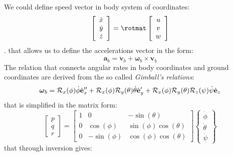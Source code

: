 We could define speed vector in body system of coordinates:
\begin{equation}
\vettore{\dot{x} \\ \dot{y} \\ \dot{z}} = \rotmat \vettore{u\\v\\w}
\end{equation}
.  that allows us to define the accelerations vector in the form:
\begin{equation}
\mathbf{a}_b = \dot{\mathbf{v}}_b + \boldsymbol{\omega}_b \times \mathbf{v}_b
\end{equation}
The relation that connects angular rates in body coordinates and ground coordinates are derived from the so called \emph{Gimball's relations}:
\begin{equation}
\boldsymbol{\omega}_b = \mathcal{R}_x (\phi) \dot{\phi} \hat{\mathbf{e}}''_x + \mathcal{R}_x(\phi) \mathcal{R}_y(\theta) \dot{\theta} \hat{\mathbf{e}}'_y + \mathcal{R}_x(\phi) \mathcal{R}_y(\theta) \mathcal{R}_z(\psi) \dot{\psi} \hat{\mathbf{e}}_z
\end{equation}
that is simplified in the matrix form:
\begin{equation*}
\left[ \begin{array}{c} p \\ q \\ r \end{array} \right] = \left[ \begin{array}{ccc}
 1 & 0 & -\sin(\theta) \\
 0 & \cos(\phi) & \sin(\phi)\cos(\theta) \\
 0 & -\sin(\phi) & \cos(\phi)\cos(\theta)
 \end{array} \right] \left\{ \begin{array}{c} \dot{\phi} \\ \dot{\theta} \\ \dot{\psi} \end{array} \right\}
\end{equation*}
that through inversion gives:
